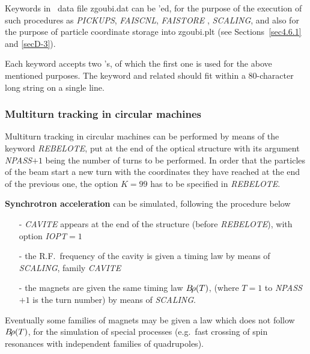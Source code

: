 Keywords in \zgou\ data file zgoubi.dat can be \LABEL'ed, for the purpose of 
the execution of such procedures as  \textsl{PICKUPS}, \textsl{FAISCNL}, \textsl{FAISTORE}
, \textsl{SCALING}, and also for the purpose of 
particle coordinate storage into zgoubi.plt (see Sections~\ref{sec4.6.1} 
and \ref{secD-3}). 

\noindent Each keyword accepts two \LABEL's, of which the first one is used for the 
above mentioned purposes. The keyword and related \LABEL['s] should fit within a 80-character 
long string on a single line. 

\subsubsection{Multiturn tracking in circular machines} \label{sec4.6.5}

Multiturn tracking  in circular machines can be performed by
means of the keyword \textsl{REBELOTE}, put at the end of the optical structure 
with its argument \textsl{NPASS}$+1$ being the number of turns to be 
performed. In order that the \IMAX{} particles of the beam start a new 
turn with the coordinates they have reached at the end of the 
previous one, the option $ K=99 $ has to be specified in \textsl{REBELOTE}.
\bigskip

\noindent\textbf{Synchrotron acceleration} can be simulated, following the 
procedure below  
\begin{itemize}
\item[-] \textsl{CAVITE} appears at the end of the structure (before
\textsl{REBELOTE}), with option \textsl{IOPT}$=1$ 

\item[-] the R.F.\ frequency of the cavity is given a timing law by 
means of \textsl{SCALING}, family \textsl{CAVITE}

\item[-] the magnets are given the same timing law $ B\!\rho (T)$,  
(where $T=1 $ to \textsl{NPASS}$+1$ is the turn number) by means of \textsl{SCALING}. \par
\end{itemize}

\noindent Eventually some families of magnets may be given a law which does 
not follow $ B\!\rho (T)$,  for the simulation of special processes (e.g.\ 
fast crossing of spin resonances with independent families of 
quadrupoles). 

